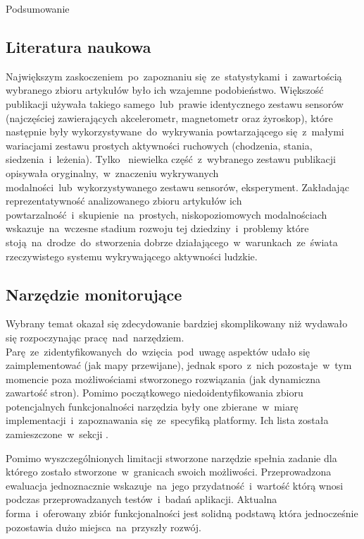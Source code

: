 \begin{chapter}{Podsumowanie}
	\subsection{Literatura naukowa}
	Największym zaskoczeniem~po~zapoznaniu się~ze~statystykami~i~zawartością wybranego zbioru artykułów było ich wzajemne podobieństwo. Większość publikacji używała takiego samego~lub~prawie identycznego zestawu sensorów (najczęściej zawierających akcelerometr, magnetometr oraz żyroskop), które następnie były wykorzystywane~do~wykrywania powtarzającego się~z~małymi wariacjami zestawu prostych aktywności ruchowych (chodzenia, stania, siedzenia~i~leżenia). Tylko~ niewielka część~z~wybranego zestawu publikacji opisywała oryginalny,~w~znaczeniu wykrywanych modalności~lub~wykorzystywanego zestawu sensorów, eksperyment. Zakładając reprezentatywność analizowanego zbioru artykułów ich powtarzalność~i~skupienie~na~prostych, niskopoziomowych modalnościach wskazuje~na~wczesne stadium rozwoju tej dziedziny~i~problemy które stoją~na~drodze~do~stworzenia dobrze działającego~w~warunkach~ze~świata rzeczywistego systemu wykrywającego aktywności ludzkie.
	
	\subsection{Narzędzie monitorujące}
	Wybrany temat okazał się zdecydowanie bardziej skomplikowany niż wydawało się rozpoczynając pracę~nad~narzędziem. Parę~ze~zidentyfikowanych~do~wzięcia~pod~uwagę aspektów udało się zaimplementować (jak mapy przewijane), jednak sporo~z~nich pozostaje~w~tym momencie poza możliwościami stworzonego rozwiązania (jak dynamiczna zawartość stron). Pomimo początkowego niedoidentyfikowania zbioru potencjalnych funkcjonalności narzędzia były one zbierane~w~miarę implementacji~i~zapoznawania się~ze~specyfiką platformy. Ich lista została zamieszczone~w~sekcji .
	
	Pomimo wyszczególnionych limitacji stworzone narzędzie spełnia zadanie dla którego zostało stworzone~w~granicach swoich możliwości. Przeprowadzona ewaluacja jednoznacznie wskazuje~na~jego przydatność~i~wartość którą wnosi  podczas przeprowadzanych testów~i~badań aplikacji. Aktualna forma~i~oferowany zbiór funkcjonalności jest solidną podstawą która jednocześnie pozostawia dużo miejsca~na~przyszły rozwój.
	
\end{chapter}
